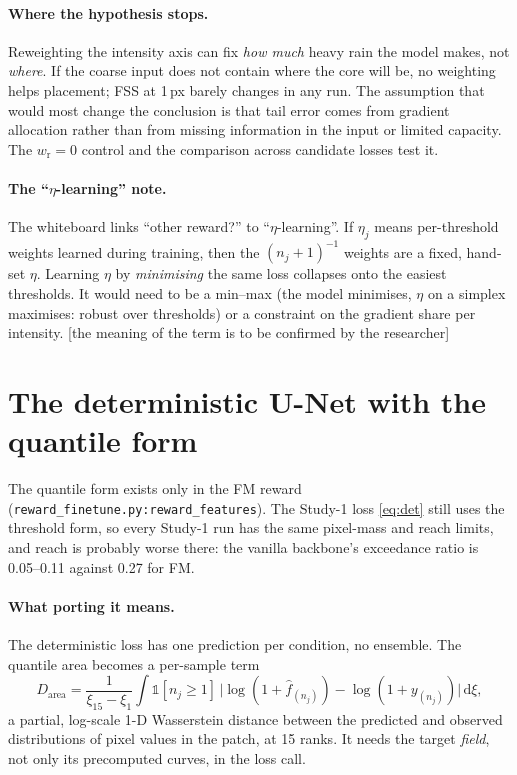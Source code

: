 \documentclass[11pt,a4paper]{article}
\newcommand{\status}[1]{\textsf{\small[#1]}}
\begin{document}
\paragraph{Where the hypothesis stops.} Reweighting the intensity axis can fix \emph{how much} heavy rain the model makes,
not \emph{where}. If the coarse input does not contain where the core will be, no weighting helps placement; FSS at
1\,px barely changes in any run. The assumption that would most change the conclusion is that tail error comes from
gradient allocation rather than from missing information in the input or limited capacity. The $w_{\mathrm r} = 0$
control and the comparison across candidate losses test it.

\paragraph{The ``$\eta$-learning'' note.} The whiteboard links ``other reward?'' to ``$\eta$-learning''. If $\eta_j$ means
per-threshold weights learned during training, then the $(n_j+1)^{-1}$ weights are a fixed, hand-set $\eta$. Learning
$\eta$ by \emph{minimising} the same loss collapses onto the easiest thresholds. It would need to be a min--max (the model
minimises, $\eta$ on a simplex maximises: robust over thresholds) or a constraint on the gradient share per intensity.
\status{the meaning of the term is to be confirmed by the researcher}

\section{The deterministic U-Net with the quantile form}\label{sec:unet}

The quantile form exists only in the FM reward (\texttt{reward\_finetune.py:reward\_features}). The Study-1 loss
\eqref{eq:det} still uses the threshold form, so every Study-1 run has the same pixel-mass and reach limits, and reach is
probably worse there: the vanilla backbone's exceedance ratio is 0.05--0.11 against 0.27 for FM.

\paragraph{What porting it means.} The deterministic loss has one prediction per condition, no ensemble. The quantile
area becomes a per-sample term
\[
  D_{\mathrm{area}} = \frac{1}{\xi_{15}-\xi_1}\int \mathbb 1[n_j\ge1]\,\big|\log(1+\hat f_{(n_j)}) - \log(1+y_{(n_j)})\big|\,\mathrm d\xi ,
\]
a partial, log-scale 1-D Wasserstein distance between the predicted and observed distributions of pixel values in the
patch, at 15 ranks. It needs the target \emph{field}, not only its precomputed curves, in the loss call.
\end{document}
